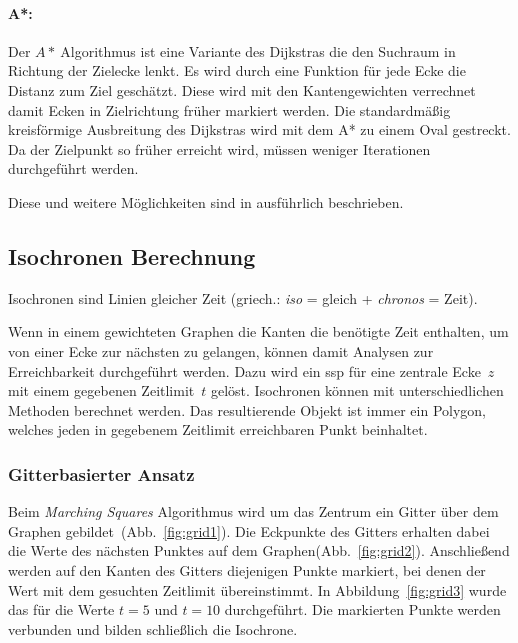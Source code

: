\paragraph*{A*:}
Der $A*~$Algorithmus ist eine Variante des Dijkstras die den Suchraum in Richtung der Zielecke lenkt.
Es wird durch eine Funktion für jede Ecke die Distanz zum Ziel geschätzt.
Diese wird mit den Kantengewichten verrechnet damit Ecken in Zielrichtung früher markiert werden.
Die standardmäßig kreisförmige Ausbreitung des Dijkstras wird mit dem A* zu einem Oval gestreckt.
Da der Zielpunkt so früher erreicht wird, müssen weniger Iterationen durchgeführt werden.

Diese und weitere Möglichkeiten sind in \cite[209--213]{kurt} ausführlich beschrieben.

\subsection{Isochronen Berechnung}

Isochronen sind Linien gleicher Zeit (griech.: \textit{iso} = gleich + \textit{chronos} = Zeit).

Wenn in einem gewichteten Graphen die Kanten die benötigte Zeit enthalten, um von einer Ecke zur nächsten zu gelangen, können damit Analysen zur Erreichbarkeit durchgeführt werden.
Dazu wird ein \gls{ssp} für eine zentrale Ecke~$z$ mit einem gegebenen Zeitlimit~$t$ gelöst.
Isochronen können mit unterschiedlichen Methoden berechnet werden.
Das resultierende Objekt ist immer ein Polygon, welches jeden in gegebenem Zeitlimit erreichbaren Punkt beinhaltet.


\subsubsection{Gitterbasierter Ansatz}

Beim \textit{Marching Squares} Algorithmus wird um das Zentrum ein Gitter über dem Graphen gebildet~(Abb.~\ref{fig:grid1}).
Die Eckpunkte des Gitters erhalten dabei die Werte des nächsten Punktes auf dem Graphen(Abb.~\ref{fig:grid2}).
Anschließend werden auf den Kanten des Gitters diejenigen Punkte markiert, bei denen der Wert mit dem gesuchten Zeitlimit übereinstimmt.
In Abbildung~\ref{fig:grid3} wurde das für die Werte $t=5$ und $t=10$ durchgeführt.
Die markierten Punkte werden verbunden und bilden schließlich die Isochrone.

